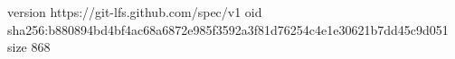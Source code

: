 version https://git-lfs.github.com/spec/v1
oid sha256:b880894bd4bf4ac68a6872e985f3592a3f81d76254c4e1e30621b7dd45c9d051
size 868
